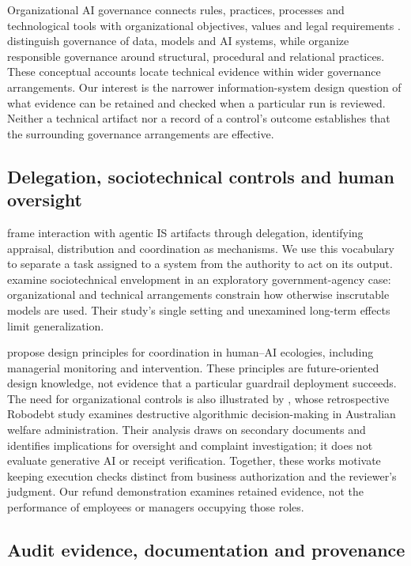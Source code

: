 \documentclass[11pt]{article}
\begin{document}
Organizational AI governance connects rules, practices, processes and technological tools with organizational objectives, values and legal requirements \citep{mantymaki2022}. \citet{schneider2022} distinguish governance of data, models and AI systems, while \citet{papagiannidis2025} organize responsible governance around structural, procedural and relational practices. These conceptual accounts locate technical evidence within wider governance arrangements. Our interest is the narrower information-system design question of what evidence can be retained and checked when a particular run is reviewed. Neither a technical artifact nor a record of a control's outcome establishes that the surrounding governance arrangements are effective.

\subsection{Delegation, sociotechnical controls and human oversight}

\citet{baird2021} frame interaction with agentic IS artifacts through delegation, identifying appraisal, distribution and coordination as mechanisms. We use this vocabulary to separate a task assigned to a system from the authority to act on its output. \citet{asatiani2021} examine sociotechnical envelopment in an exploratory government-agency case: organizational and technical arrangements constrain how otherwise inscrutable models are used. Their study's single setting and unexamined long-term effects limit generalization.

\citet{grisold2025} propose design principles for coordination in human--AI ecologies, including managerial monitoring and intervention. These principles are future-oriented design knowledge, not evidence that a particular guardrail deployment succeeds. The need for organizational controls is also illustrated by \citet{rintakahila2022}, whose retrospective Robodebt study examines destructive algorithmic decision-making in Australian welfare administration. Their analysis draws on secondary documents and identifies implications for oversight and complaint investigation; it does not evaluate generative AI or receipt verification. Together, these works motivate keeping execution checks distinct from business authorization and the reviewer's judgment. Our refund demonstration examines retained evidence, not the performance of employees or managers occupying those roles.

\subsection{Audit evidence, documentation and provenance}
\end{document}
